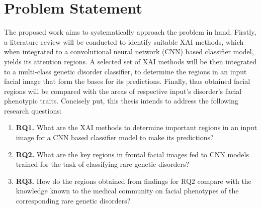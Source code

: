 \documentclass[../report.tex]{subfiles}
\begin{document}
    \section{Problem Statement}
 	The proposed work aims to systematically approach the problem in hand. Firstly, a literature review will be conducted to identify suitable XAI methods, which when integrated to a convolutional neural network (CNN) based classifier model, yields its attention regions. A selected set of XAI methods will be then integrated to a multi-class genetic disorder classifier, to determine the regions in an input facial image that form the bases for its predictions. Finally, thus obtained facial regions will be compared with the areas of respective input's disorder's facial phenotypic traits. Concisely put, this thesis intends to address the following research questions: 
 	\begin{enumerate}
 		\item [] \textbf{RQ1.} What are the XAI methods to determine important regions in an input image for a CNN based classifier model to make its predictions?  
 		\item [] \textbf{RQ2.} What are the key regions in frontal facial images fed to CNN models trained for the task of classifying rare genetic disorders?
 		\item [] \textbf{RQ3.} How do the regions obtained from findings for RQ2 compare with the knowledge known to the medical community on facial phenotypes of the corresponding rare genetic disorders? 
 	\end{enumerate}
\end{document}
